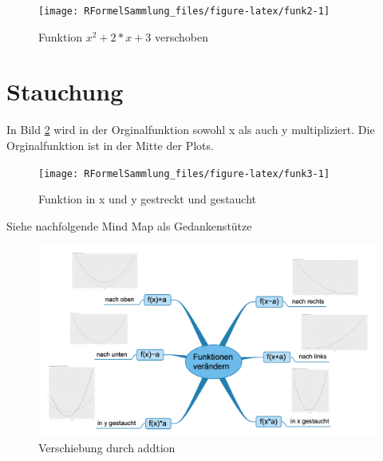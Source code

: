 \documentclass[]{book}
\begin{document}
\begin{figure}
\texttt{[image: RFormelSammlung\_files/figure-latex/funk2-1]} \caption{Funktion $x^2+2*x+3$ verschoben}\label{fig:funk2}
\end{figure}

\section{Stauchung}\label{stauchung}

In Bild \ref{fig:funk3} wird in der Orginalfunktion sowohl x als auch y
multipliziert. Die Orginalfunktion ist in der Mitte der Plots.

\begin{figure}
\texttt{[image: RFormelSammlung\_files/figure-latex/funk3-1]} \caption{Funktion in x und y gestreckt und gestaucht}\label{fig:funk3}
\end{figure}

Siehe nachfolgende Mind Map als Gedankenstütze

\begin{figure}

{\centering \includegraphics[width=25in]{image/FunktionsVerschiebung} 

}

\caption{Verschiebung durch addtion}\label{fig:mindMapVerschiebung}
\end{figure}


\end{document}
